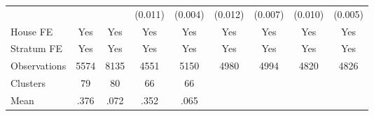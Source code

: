 {\begin{tabular}{l*{8}{c}}
                &                  &                  &  (0.011)         &  (0.004)         &  (0.012)         &  (0.007)         &  (0.010)         &  (0.005)         \\
House FE        &      Yes         &      Yes         &      Yes         &      Yes         &      Yes         &      Yes         &      Yes         &      Yes         \\
Stratum FE      &      Yes         &      Yes         &      Yes         &      Yes         &      Yes         &      Yes         &      Yes         &      Yes         \\
\midrule
Observations    &     5574         &     8135         &     4551         &     5150         &     4980         &     4994         &     4820         &     4826         \\
Clusters        &       79         &       80         &       66         &       66         &                  &                  &                  &                  \\
Mean            &     .376         &     .072         &     .352         &     .065         &                  &                  &                  &                  \\
\bottomrule
\end{tabular}
}
